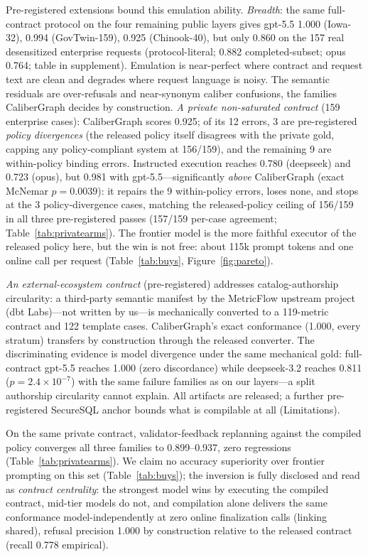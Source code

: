 \documentclass[letterpaper]{article}
\begin{document}
 Pre-registered extensions bound this emulation ability. \emph{Breadth}: the same full-contract protocol on the four remaining public layers gives gpt-5.5 1.000 (Iowa-32), 0.994 (GovTwin-159), 0.925 (Chinook-40), but only 0.860 on the 157 real desensitized enterprise requests (protocol-literal; 0.882 completed-subset; opus 0.764; table in supplement). Emulation is near-perfect where contract and request text are clean and degrades where request language is noisy. The semantic residuals are over-refusals and near-synonym caliber confusions, the families CaliberGraph decides by construction. \emph{A private non-saturated contract} (159 enterprise cases): CaliberGraph scores 0.925; of its 12 errors, 3 are pre-registered \emph{policy divergences} (the released policy itself disagrees with the private gold, capping any policy-compliant system at 156/159), and the remaining 9 are within-policy binding errors. Instructed execution reaches 0.780 (deepseek) and 0.723 (opus), but 0.981 with gpt-5.5---significantly \emph{above} CaliberGraph (exact McNemar $p{=}0.0039$): it repairs the 9 within-policy errors, loses none, and stops at the 3 policy-divergence cases, matching the released-policy ceiling of 156/159 in all three pre-registered passes (157/159 per-case agreement; Table~\ref{tab:privatearms}). The frontier model is the more faithful executor of the released policy here, but the win is not free: about 115k prompt tokens and one online call per request (Table~\ref{tab:buys}, Figure~\ref{fig:pareto}).

\emph{An external-ecosystem contract} (pre-registered) addresses catalog-authorship circularity: a third-party semantic manifest by the MetricFlow upstream project (dbt Labs)---not written by us---is mechanically converted to a 119-metric contract and 122 template cases. CaliberGraph's exact conformance (1.000, every stratum) transfers by construction through the released converter. The discriminating evidence is model divergence under the same mechanical gold: full-contract gpt-5.5 reaches 1.000 (zero discordance) while deepseek-3.2 reaches 0.811 ($p{=}2.4{\times}10^{-7}$) with the same failure families as on our layers---a split authorship circularity cannot explain. All artifacts are released; a further pre-registered SecureSQL anchor bounds what is compilable at all (Limitations).

On the same private contract, validator-feedback replanning against the compiled policy converges all three families to 0.899--0.937, zero regressions (Table~\ref{tab:privatearms}). We claim no accuracy superiority over frontier prompting on this set (Table~\ref{tab:buys}); the inversion is fully disclosed and read as \emph{contract centrality}: the strongest model wins by executing the compiled contract, mid-tier models do not, and compilation alone delivers the same conformance model-independently at zero online finalization calls (linking shared), refusal precision 1.000 by construction relative to the released contract (recall 0.778 empirical).
\end{document}
